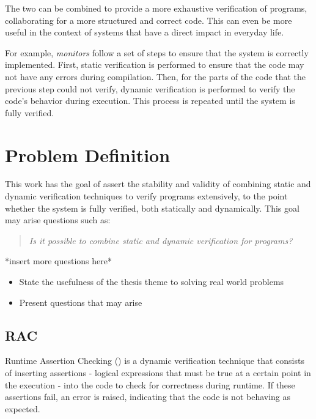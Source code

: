 The two can  be combined to provide a more exhaustive verification of \ocaml programs, 
collaborating for a more structured and correct code. This can even be more useful in the context of 
systems that have a direct impact in everyday life.

For example, \textit{monitors} follow a set of steps to ensure that the system is correctly implemented. 
First, static verification is performed to ensure that the code may not have any errors during compilation.
Then, for the parts of the code that the previous step could not verify, dynamic verification is performed 
to verify the code's behavior during execution. This process is repeated until the system is fully verified.

\section{Problem Definition}
\label{sec:problem_definition}

This work has the goal of assert the stability and validity of combining static and dynamic verification techniques 
to verify \ocaml programs extensively, to the point whether the system is fully verified, both statically and dynamically.
This goal may arise questions such as:

\begin{quote}
    \emph{Is it possible to combine static and dynamic verification for \ocaml programs?}
\end{quote}

*insert more questions here*


\begin{itemize}
    \item State the usefulness of the thesis theme to solving real world problems
    \item Present questions that may arise
\end{itemize}

\subsection{RAC}
\label{sub:rac}

Runtime Assertion Checking (\rac) is a dynamic verification technique that consists of 
inserting assertions - logical expressions that must be true at a certain point in the 
execution - into the code to check for correctness during runtime. If these assertions fail, 
an error is raised, indicating that the code is not behaving as expected.

